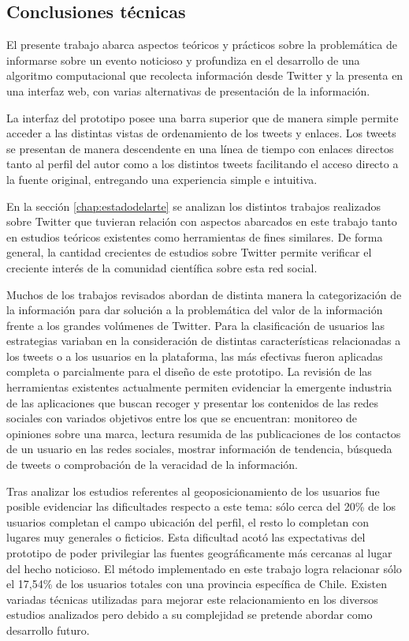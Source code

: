 \subsection{Conclusiones técnicas}

El presente trabajo abarca aspectos teóricos y prácticos sobre la problemática
de informarse sobre un evento noticioso y profundiza en el desarrollo de una algoritmo computacional que recolecta información desde Twitter y la presenta en una interfaz web, con varias alternativas de presentación de la información.

La interfaz del prototipo posee una barra superior que de manera simple permite acceder a las distintas vistas de ordenamiento de los tweets y enlaces. Los tweets se presentan de manera descendente en una línea de tiempo con enlaces directos tanto al perfil del autor como a los distintos tweets facilitando el acceso directo a la fuente original, entregando una experiencia simple e intuitiva.

En la sección \ref{chap:estadodelarte} se analizan los distintos trabajos realizados sobre Twitter que tuvieran relación con aspectos abarcados en este trabajo tanto en estudios teóricos existentes como herramientas de fines similares. De forma general, la cantidad crecientes de estudios sobre Twitter permite verificar el creciente interés de la comunidad científica sobre esta red social.

Muchos de los trabajos revisados abordan de distinta manera la categorización de la información para dar solución a la problemática del valor de la información frente a los grandes volúmenes de Twitter. Para la clasificación de usuarios las estrategias variaban en la consideración de distintas características relacionadas a los tweets o a los usuarios en la plataforma, las más efectivas fueron aplicadas completa o parcialmente para el diseño de este prototipo. La revisión de las herramientas existentes actualmente permiten evidenciar la emergente industria de las aplicaciones que buscan recoger y presentar los contenidos de las redes sociales con variados objetivos entre los que se encuentran: monitoreo de opiniones sobre una marca, lectura resumida de las publicaciones de los contactos de un usuario en las redes sociales, mostrar información de tendencia, búsqueda de tweets o comprobación de la veracidad de la información.

Tras analizar los estudios referentes al geoposicionamiento de los usuarios fue posible evidenciar las dificultades respecto a este tema: sólo cerca del 20\% de los usuarios completan el campo ubicación del perfil, el resto lo completan con lugares muy generales o ficticios. Esta dificultad acotó las expectativas del prototipo de poder privilegiar las fuentes geográficamente más cercanas al lugar del hecho noticioso. El método implementado en este trabajo logra relacionar sólo el 17,54\% de los usuarios totales con una provincia específica de Chile. Existen variadas técnicas utilizadas para mejorar este relacionamiento en los diversos estudios analizados  \cite{Cheng:2010:YYT:1871437.1871535} \cite{McGee:2011:GST:2063576.2063959} pero debido a su complejidad se pretende abordar como desarrollo futuro.

